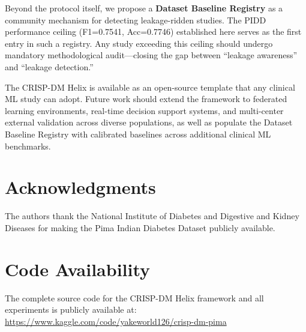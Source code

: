 \documentclass[3p,twocolumn]{elsarticle}
\begin{document}
Beyond the protocol itself, we propose a \textbf{Dataset Baseline Registry} as a community mechanism for detecting leakage-ridden studies. The PIDD performance ceiling (F1=0.7541, Acc=0.7746) established here serves as the first entry in such a registry. Any study exceeding this ceiling should undergo mandatory methodological audit---closing the gap between ``leakage awareness'' and ``leakage detection.''

The CRISP-DM Helix is available as an open-source template that any clinical ML study can adopt. Future work should extend the framework to federated learning environments, real-time decision support systems, and multi-center external validation across diverse populations, as well as populate the Dataset Baseline Registry with calibrated baselines across additional clinical ML benchmarks.

\section*{Acknowledgments}
The authors thank the National Institute of Diabetes and Digestive and Kidney Diseases for making the Pima Indian Diabetes Dataset publicly available.

\section*{Code Availability}
The complete source code for the CRISP-DM Helix framework and all experiments is publicly available at: \url{https://www.kaggle.com/code/yakeworld126/crisp-dm-pima}




\end{document}
